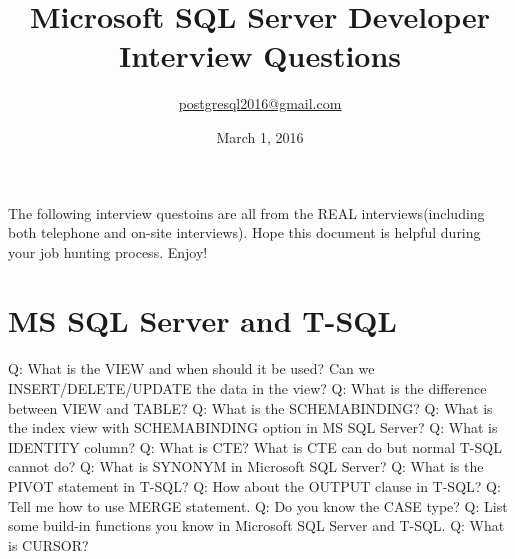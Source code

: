\documentclass[a4paper,11pt]{article}
\begin{document}
\title{Microsoft SQL Server Developer Interview Questions}
\author{\url{postgresql2016@gmail.com}}
\date{March 1, 2016}
\maketitle
The following interview questoins are all from the REAL interviews(including both telephone and on-site interviews). Hope this document is helpful during your job hunting process. Enjoy!
\section{MS SQL Server and T-SQL}
Q: What is the VIEW and when should it be used? Can we INSERT/DELETE/UPDATE the data in the view?\newline \newline
\noindent 
Q: What is the difference between VIEW and TABLE? \newline \newline
\noindent 
Q: What is the SCHEMABINDING? \newline \newline
\noindent 
Q: What is the index view with SCHEMABINDING option in MS SQL Server? \newline \newline
\noindent 
Q: What is IDENTITY column? \newline \newline
\noindent 
Q: What is CTE? What is CTE can do but normal T-SQL cannot do?\newline \newline
\noindent 
Q: What is SYNONYM in Microsoft SQL Server? \newline \newline
\noindent 
Q: What is the PIVOT statement in T-SQL? \newline \newline
\noindent 
Q: How about the OUTPUT clause in T-SQL? \newline \newline
\noindent 
Q: Tell me how to use MERGE statement. \newline \newline
\noindent 
Q: Do you know the CASE type? \newline \newline
\noindent 
Q: List some build-in functions you know in Microsoft SQL Server and T-SQL. \newline \newline
\noindent 
Q: What is CURSOR? \newline \newline
\end{document}
